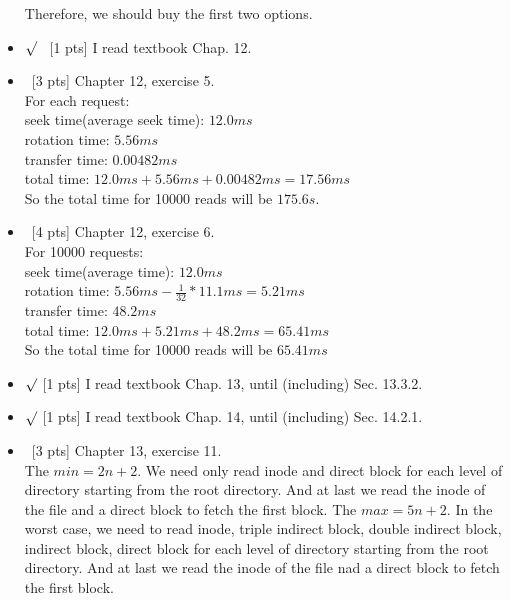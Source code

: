 \documentclass[10pt]{article}
\begin{document}
\begin{itemize}
Therefore, we should buy the first two options. 
\item $\surd$ \ [1 pts] I read textbook Chap. 12.
\item \ [3 pts] Chapter 12, exercise 5.\\
For each request:\\
seek time(average seek time): $12.0ms$\\
rotation time: $5.56ms$\\
transfer time: $0.00482ms$\\
total time: $12.0ms+5.56ms+0.00482ms=17.56ms$\\
So the total time for 10000 reads will be $175.6s$.
\item \ [4 pts] Chapter 12, exercise 6.\\
For 10000 requests:\\
seek time(average time): $12.0ms$\\
rotation time: $5.56ms-\frac{1}{32}*11.1ms=5.21ms$\\
transfer time: $48.2ms$\\
total time: $12.0ms+5.21ms+48.2ms=65.41ms$\\
So the total time for 10000 reads will be $65.41ms$
\item $\surd$ [1 pts] I read textbook Chap. 13, until (including) Sec. 13.3.2.
\item $\surd$ [1 pts] I read textbook Chap. 14, until (including) Sec. 14.2.1.
\item \ [3 pts] Chapter 13, exercise 11.\\
The $min=2n+2$. We need only read inode and direct block for each level of directory starting from the root directory. And at last we read the inode of the file and a direct block to fetch the first block.
The $max=5n+2$. In the worst case, we need to read inode, triple indirect block, double indirect block, indirect block, direct block for each level of directory starting from the root directory. And at last we read the inode of the file nad a direct block to fetch the first block.
\end{itemize}
\end{document}
